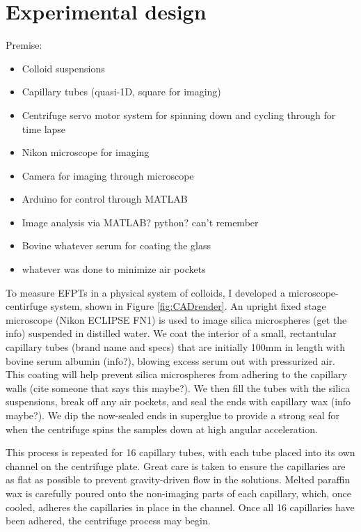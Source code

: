 
\section{Experimental design}
Premise:
\begin{itemize}
    \item Colloid suspensions
    \item Capillary tubes (quasi-1D, square for imaging)
    \item Centrifuge servo motor system for spinning down and cycling through for time lapse
    \item Nikon microscope for imaging
    \item Camera for imaging through microscope
    \item Arduino for control through MATLAB
    \item Image analysis via MATLAB? python? can't remember
    \item Bovine whatever serum for coating the glass
    \item whatever was done to minimize air pockets
\end{itemize}

To measure EFPTs in a physical system of colloids, I developed a microscope-centirfuge system, shown in Figure \ref{fig:CADrender}. An upright fixed stage microscope (Nikon ECLIPSE FN1) is used to image silica microspheres (get the info) suspended in distilled water. We coat the interior of a small, rectantular capillary tubes (brand name and specs) that are initially 100mm in length with bovine serum albumin (info?), blowing excess serum out with pressurized air. This coating will help prevent silica microspheres from adhering to the capillary walls (cite someone that says this maybe?). We then fill the tubes with the silica suspensions, break off any air pockets, and seal the ends with capillary wax (info maybe?). We dip the now-sealed ends in superglue to provide a strong seal for when the centrifuge spins the samples down at high angular acceleration.

This process is repeated for 16 capillary tubes, with each tube placed into its own channel on the centrifuge plate. Great care is taken to ensure the capillaries are as flat as possible to prevent gravity-driven flow in the solutions. Melted paraffin wax is carefully poured onto the non-imaging parts of each capillary, which, once cooled, adheres the capillaries in place in the channel. Once all 16 capillaries have been adhered, the centrifuge process may begin.

